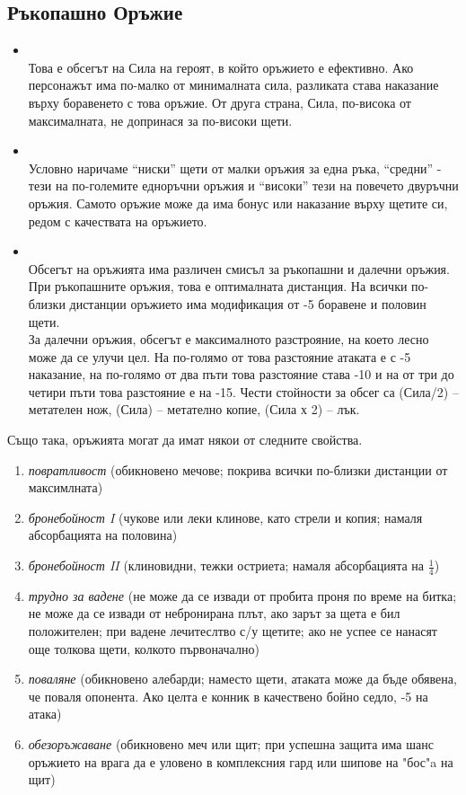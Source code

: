 \subsection{Ръкопашно Оръжие}
\begin{itemize}
\item {} \\
Това е обсегът на Сила на героят, в който оръжието е ефективно.
Ако персонажът има по-малко от минималната сила, разликата става наказание върху боравенето с това оръжие.
От друга страна, Сила, по-висока от максималната, не допринася за по-високи щети.
\item {} \\
Условно наричаме “ниски” щети от малки оръжия за една ръка, “средни” - тези на по-големите
едноръчни оръжия и “високи” тези на повечето двуръчни оръжия.
Самото оръжие може да има бонус или наказание върху щетите си, редом с качествата на оръжието.
\item {} \\
Обсегът на оръжията има различен смисъл за ръкопашни и далечни оръжия.
При ръкопашните оръжия, това е оптималната дистанция.
На всички по-близки дистанции оръжието има модификация от -5 боравене и половин щети.
\\
За далечни оръжия, обсегът е максималното разстрояние, на което лесно може да се улучи цел.
На по-голямо от това разстояние атаката е с -5 наказание, на по-голямо от два пъти това разстояние става -10 и на от три до четири пъти това разстояние е на -15.
Чести стойности за обсег са (Сила/2) – метателен нож, (Сила) – метателно копие, (Сила х 2) – лък.
\end{itemize}

Също така, оръжията могат да имат някои от следните свойства.
\begin{enumerate}
\item{\textit{повратливост} (обикновено мечове; покрива всички по-близки дистанции от максимлната)}
\item{\textit{бронебойност I} (чукове или леки клинове, като стрели и копия; намаля абсорбацията на половина)}
\item{\textit{бронебойност II} (клиновидни, тежки остриета; намаля абсорбацията на $\frac1 4$)}
\item{\textit{трудно за вадене} (не може да се извади от пробита проня по време на битка; не може да се извади от небронирана плът, ако зарът за щета е бил положителен; при вадене лечитеслтво с/у щетите; ако не успее се  нанасят още толкова щети, колкото първоначално)}
\item{\textit{поваляне} (обикновено алебарди; наместо щети, атаката може да бъде обявена, че поваля опонента. Ако целта е конник в качествено бойно седло, -5 на атака)}
\item{\textit{обезоръжаване} (обикновено меч или щит; при успешна защита има шанс оръжието на врага да е уловено в комплексния гард или шипове на "бос"a на щит)}
\end{enumerate}

